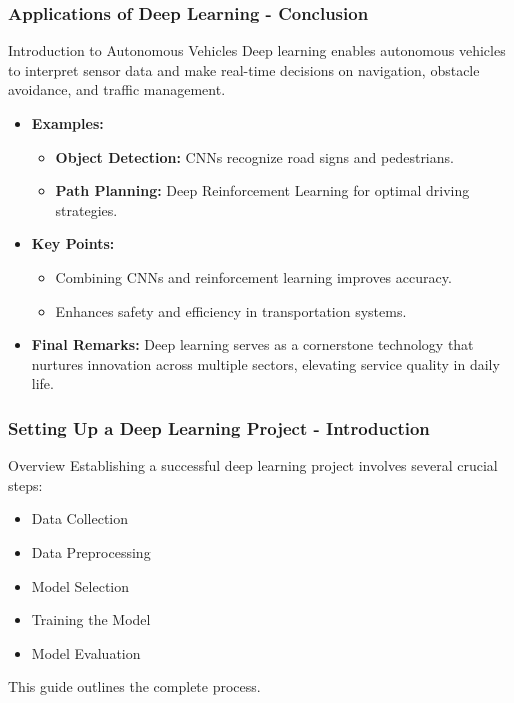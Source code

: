 \documentclass[aspectratio=169]{beamer}
\begin{document}
\begin{frame}[fragile]
    \frametitle{Applications of Deep Learning - Conclusion}
    \begin{block}{Introduction to Autonomous Vehicles}
        Deep learning enables autonomous vehicles to interpret sensor data and make real-time decisions on navigation, obstacle avoidance, and traffic management.
    \end{block}
    
    \begin{itemize}
        \item \textbf{Examples:}
        \begin{itemize}
            \item \textbf{Object Detection:} CNNs recognize road signs and pedestrians.
            \item \textbf{Path Planning:} Deep Reinforcement Learning for optimal driving strategies.
        \end{itemize}
        
        \item \textbf{Key Points:}
        \begin{itemize}
            \item Combining CNNs and reinforcement learning improves accuracy.
            \item Enhances safety and efficiency in transportation systems.
        \end{itemize}
        
        \item \textbf{Final Remarks:} 
        Deep learning serves as a cornerstone technology that nurtures innovation across multiple sectors, elevating service quality in daily life.
    \end{itemize}
\end{frame}

\begin{frame}[fragile]
    \frametitle{Setting Up a Deep Learning Project - Introduction}
    \begin{block}{Overview}
        Establishing a successful deep learning project involves several crucial steps:
        \begin{itemize}
            \item Data Collection
            \item Data Preprocessing
            \item Model Selection
            \item Training the Model
            \item Model Evaluation
        \end{itemize}
        This guide outlines the complete process.
    \end{block}
\end{frame}
\end{document}
